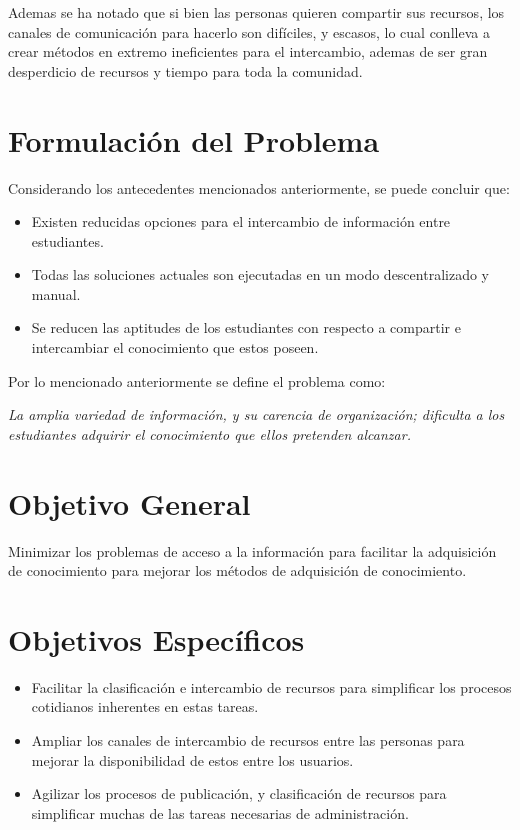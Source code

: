 \documentclass[letter,11pt,oneside,spanish]{article}
\begin{document}
Ademas se ha notado que si bien las personas quieren compartir sus recursos, los
canales de comunicación para hacerlo son difíciles, y escasos, lo cual conlleva
a crear métodos en extremo ineficientes para el intercambio, ademas de ser gran
desperdicio de recursos y tiempo para toda la comunidad.

\section{Formulación del Problema}
Considerando los antecedentes mencionados anteriormente, se puede concluir que:

\begin{itemize}
\item Existen reducidas opciones para el intercambio de información entre
estudiantes.
\item Todas las soluciones actuales son ejecutadas en un modo descentralizado y
manual.
\item Se reducen las aptitudes de los estudiantes con respecto a compartir e
intercambiar el conocimiento que estos poseen.
\end{itemize}

Por lo mencionado anteriormente se define el problema como:

\emph{La amplia variedad de información, y su carencia de organización;
dificulta a los estudiantes adquirir el conocimiento que ellos pretenden
alcanzar.}

\section{Objetivo General}
Minimizar los problemas de acceso a la información para facilitar la adquisición
de conocimiento para mejorar los métodos de adquisición de conocimiento.

\section{Objetivos Específicos}
\begin{itemize}
\item Facilitar la clasificación e intercambio de recursos para simplificar los
procesos cotidianos inherentes en estas tareas.
\item Ampliar los canales de intercambio de recursos entre las personas para
mejorar la disponibilidad de estos entre los usuarios.
\item Agilizar los procesos de publicación, y clasificación de recursos para
simplificar muchas de las tareas necesarias de administración.
\end{itemize}
\end{document}
